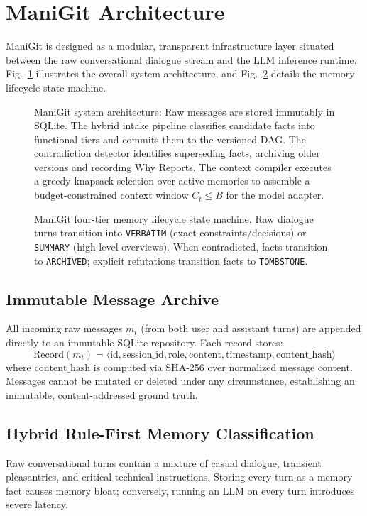\section{ManiGit Architecture}
\label{sec:manigit_architecture}

ManiGit is designed as a modular, transparent infrastructure layer situated between the raw conversational dialogue stream and the LLM inference runtime. Fig.~\ref{fig:architecture} illustrates the overall system architecture, and Fig.~\ref{fig:memory_lifecycle} details the memory lifecycle state machine.

\begin{figure}[t]
\centering

\caption{ManiGit system architecture: Raw messages are stored immutably in SQLite. The hybrid intake pipeline classifies candidate facts into functional tiers and commits them to the versioned DAG. The contradiction detector identifies superseding facts, archiving older versions and recording Why Reports. The context compiler executes a greedy knapsack selection over active memories to assemble a budget-constrained context window $C_t \le B$ for the model adapter.}
\label{fig:architecture}
\end{figure}

\begin{figure}[t]
\centering

\caption{ManiGit four-tier memory lifecycle state machine. Raw dialogue turns transition into \texttt{VERBATIM} (exact constraints/decisions) or \texttt{SUMMARY} (high-level overviews). When contradicted, facts transition to \texttt{ARCHIVED}; explicit refutations transition facts to \texttt{TOMBSTONE}.}
\label{fig:memory_lifecycle}
\end{figure}

\subsection{Immutable Message Archive}
All incoming raw messages $m_t$ (from both user and assistant turns) are appended directly to an immutable SQLite repository. Each record stores:
$$\text{Record}(m_t) = \langle \text{id}, \text{session\_id}, \text{role}, \text{content}, \text{timestamp}, \text{content\_hash} \rangle$$
where $\text{content\_hash}$ is computed via SHA-256 over normalized message content. Messages cannot be mutated or deleted under any circumstance, establishing an immutable, content-addressed ground truth.

\subsection{Hybrid Rule-First Memory Classification}
Raw conversational turns contain a mixture of casual dialogue, transient pleasantries, and critical technical instructions. Storing every turn as a memory fact causes memory bloat; conversely, running an LLM on every turn introduces severe latency.

